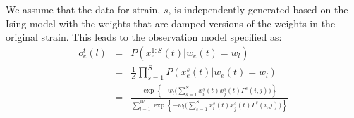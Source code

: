 \documentclass[11pt]{article}
\begin{document}
 We assume that the data
for strain, $s$, is independently generated 
based on the Ising model with the weights that are
damped versions of the weights in the original 
strain. This leads to the observation model specified as:
\begin{eqnarray}
  \label{eq:obs} o^{t}_{e}(l) &=& P(x_{e}^{1:S}(t) | w_{e}(t) = w_{l}) \\
\label{eq:obs2} & = & \frac{1}{Z} \prod_{s=1}^{S} P(x_{e}^{s}(t) |
w_{e}(t) = w_{l}) \\ 
\label{eq:obs3} & = & \frac{\exp\left\{ - w_{l}\big(\sum_{s=1}^{S}
      x^{s}_{i}(t)x^{s}_{j}(t) \Gamma^{s}(i,j)\big)
  \right\}}{\sum^{\mathcal W}_{l=1}\exp\left\{ - w_{l}\big(\sum_{s=1}^{S}  x^{s}_{i}(t)x^{s}_{j}(t) \Gamma^{s}(i,j)\big) \right\}}
\end{eqnarray}
\end{document}
